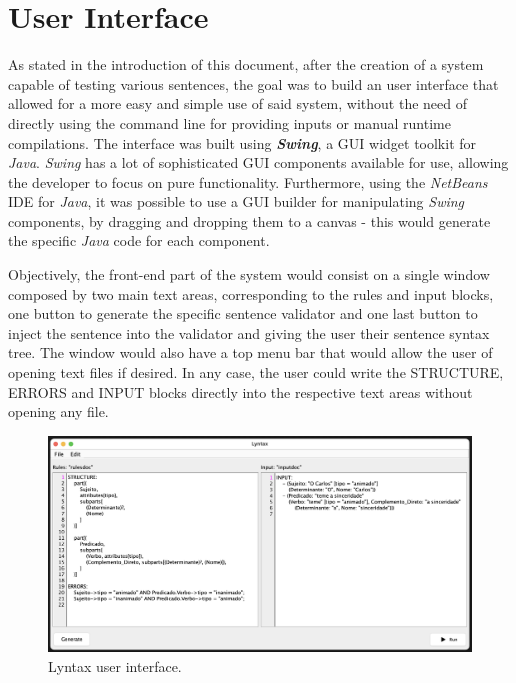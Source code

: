 \section{User Interface}

As stated in the introduction of this document, after the creation of a system capable of testing various sentences, the goal was to build an user interface
that allowed for a more easy and simple use of said system, without the need of directly using the command line for providing inputs or manual runtime compilations.
The interface was built using \emph{\textbf{Swing}}, a GUI widget toolkit for \emph{Java}.
\emph{Swing} has a lot of sophisticated GUI components available for use, allowing the developer to focus on pure functionality.
Furthermore, using the \emph{NetBeans} IDE for \emph{Java}, it was possible to use a GUI builder for manipulating \emph{Swing} components, 
by dragging and dropping them to a canvas - this would generate the specific \emph{Java} code for each component.

Objectively, the front-end part of the system would consist on a single window composed by two main text areas, corresponding to the rules and input blocks,
one button to generate the specific sentence validator and one last button to inject the sentence into the validator and giving the user their sentence syntax tree.
The window would also have a top menu bar that would allow the user of opening text files if desired.
In any case, the user could write the STRUCTURE, ERRORS and INPUT blocks directly into the respective text areas without opening any file. 

\begin{figure}[h]
    \centering
    \includegraphics[width=14cm]{images/lyntax-gui.png}
    \caption{Lyntax user interface.}
    \label{fig:lyntaxGui}
\end{figure}

